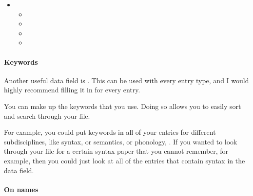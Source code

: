 \begin{multicols}{3}
\begin{itemize}
{\begin{itemize}
			\item{}
	
			\item{}

			\item{}

		\end{itemize}
	
	}
	
	\item{
	
		\begin{itemize}
		
			\item{}
			
			\item{}
			
			\item{}
			
			\item{}
		
		\end{itemize}

	}

\end{itemize}
\end{multicols}

\paragraph{Keywords}

Another useful data field is .
This can be used with every entry type, and I would highly recommend filling it in for every entry.

You can make up the keywords that you use.
Doing so allows you to easily sort and search through your  file.

For example, you could put keywords in all of your entries for different subdisciplines, like syntax, or semantics, or phonology, \ETC.
If you wanted to look through your  file for a certain syntax paper that you cannot remember, for example, then you could just look at all of the entries that contain syntax in the  data field.

\paragraph{On names}

